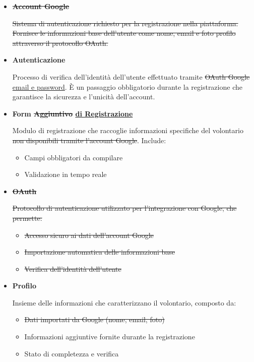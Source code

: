 \begin{itemize}

\item \sout{\textbf{Account Google}}

\sout{Sistema di autenticazione richiesto per la registrazione nella piattaforma. Fornisce le informazioni base dell'utente come nome, email e foto profilo attraverso il protocollo OAuth.}

\item \textbf{Autenticazione}

Processo di verifica dell'identità dell'utente effettuato tramite \sout{OAuth Google} \underline{email e password}. È un passaggio obbligatorio durante la registrazione che garantisce la sicurezza e l'unicità dell'account.

\item \textbf{Form \sout{Aggiuntivo} \underline{di Registrazione}}

Modulo di registrazione che raccoglie informazioni specifiche del volontario \sout{non disponibili tramite l'account Google}. Include:
\begin{itemize}
    \item Campi obbligatori da compilare
    \item Validazione in tempo reale
\end{itemize}

\item \sout{\textbf{OAuth}}

\sout{Protocollo di autenticazione utilizzato per l'integrazione con Google, che permette:}
\begin{itemize}
    \item \sout{Accesso sicuro ai dati dell'account Google}
    \item \sout{Importazione automatica delle informazioni base}
    \item \sout{Verifica dell'identità dell'utente}
\end{itemize}

\item \textbf{Profilo}

Insieme delle informazioni che caratterizzano il volontario, composto da:
\begin{itemize}
    \item \sout{Dati importati da Google (nome, email, foto)}
    \item Informazioni aggiuntive fornite durante la registrazione
    \item Stato di completezza e verifica
\end{itemize}


\end{itemize}
